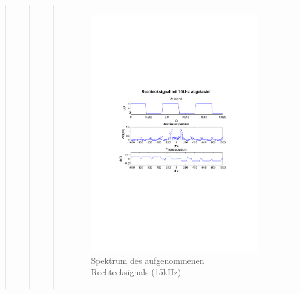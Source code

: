 \begin{quote}
\begin{quote}
\begin{quote}
\begin{center}
\begin{tabular}{ll}
\begin{minipage}{0.6\textwidth}
                        \begin{figure}[H]
                            \label{fig:}
                            \includegraphics[scale=0.65, trim = 3cm 9cm 3cm
                            8.5cm,
                            clip]{./Bilder/6_2_rechteck_15kHz}
                            \caption{Spektrum des aufgenommenen Rechtecksignals
                            (15kHz)}
                        \end{figure}
                    \vspace{-1.5em}
    
                    \end{minipage}
    
                \end{tabular}
                \end{center}
    			    	

\end{quote}
\end{quote}
\end{quote}
